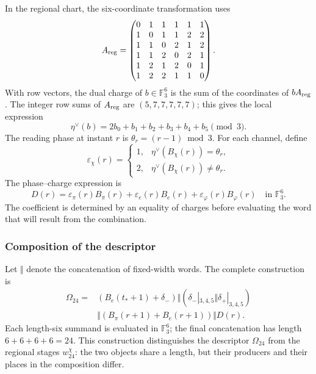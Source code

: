 In the regional chart, the six-coordinate transformation uses
\[
 A_{\rm reg}=
 \begin{pmatrix}
 0&1&1&1&1&1\\
 1&0&1&1&2&2\\
 1&1&0&2&1&2\\
 1&1&2&0&2&1\\
 1&2&1&2&0&1\\
 1&2&2&1&1&0
 \end{pmatrix}.
\]
With row vectors, the dual charge of $b\in\mathbb F_3^6$ is the sum
of the coordinates of $bA_{\rm reg}$. The integer row sums of
$A_{\rm reg}$ are $(5,7,7,7,7,7)$; this gives the local expression
\begin{equation}
 \eta^\vee(b)=2b_0+b_1+b_2+b_3+b_4+b_5\pmod3.
 \label{eq:kdes-cargadual}
\end{equation}
The reading phase at instant $r$ is
$\theta_r=(r-1)\bmod3$. For each channel, define
\[
 \varepsilon_\chi(r)=
 \begin{cases}
 1,&\eta^\vee(B_\chi(r))=\theta_r,\\
 2,&\eta^\vee(B_\chi(r))\ne\theta_r.
 \end{cases}
\]
The phase--charge expression is
\begin{equation}
 D(r)=\varepsilon_\pi(r)B_\pi(r)
      +\varepsilon_e(r)B_e(r)
      +\varepsilon_\varphi(r)B_\varphi(r)
      \quad\text{in }\mathbb F_3^6.
 \label{eq:kdes-fasecarga}
\end{equation}
The coefficient is determined by an equality of charges before evaluating
the word that will result from the combination.

\subsubsection{Composition of the descriptor}

Let $\Vert$ denote the concatenation of fixed-width words.
The complete construction is
\begin{equation}
 \begin{split}
 \Omega_{24}={}&
 (B_e(t_*+1)+\delta_-)
 \Vert (\delta_-|_{3,4,5}\Vert\delta_+|_{3,4,5})\\
 &\Vert(B_\pi(r+1)+B_e(r+1))\Vert D(r).
 \end{split}
 \label{eq:kdes-omega}
\end{equation}
Each length-six summand is evaluated in $\mathbb F_3^6$; the
final concatenation has length $6+6+6+6=24$. This construction
distinguishes the descriptor $\Omega_{24}$ from the regional stages
$w_{24}^{\chi}$: the two objects share a length, but their producers
and their places in the composition differ.

